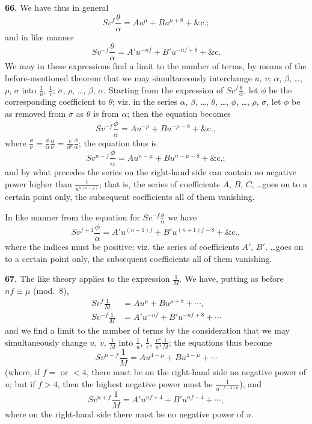 \documentclass[12pt,a4paper]{article}
\begin{document}
\textbf{66.} We have thus in general
\[
Sv^{\!f}\frac{\theta}{\alpha} = Au^{\mu} + Bu^{\mu+8} + \&\text{c.};
\]
and in like manner
\[
Sv^{-\!f}\frac{\theta}{\alpha} = A'u^{-\!nf} + B'u^{-\!nf+8} + \&\text{c.}
\]
We may in these expressions find a limit to the number of terms, by means of the before-mentioned theorem that we may simultaneously interchange $u$, $v$; $\alpha$, $\beta$, \ldots, $\rho$, $\sigma$ into $\frac{1}{u}$, $\frac{1}{v}$; $\sigma$, $\rho$, \ldots, $\beta$, $\alpha$. Starting from the expression of $Sv^{\!f}\frac{\theta}{\alpha}$, let $\phi$ be the corresponding coefficient to $\theta$; viz. in the series $\alpha$, $\beta$, \ldots, $\theta$, \ldots, $\phi$, \ldots, $\rho$, $\sigma$, let $\phi$ be as removed from $\sigma$ as $\theta$ is from $\alpha$; then the equation becomes
\[
Sv^{-\!f}\frac{\phi}{\sigma} = Au^{-\!\mu} + Bu^{-\!\mu-8} + \&\text{c.},
\]
where $\frac{\phi}{\sigma} = \frac{\phi}{\alpha} \frac{\alpha}{\sigma} = \frac{v}{u^n}\frac{\phi}{\alpha}$; the equation thus is
\[
Sv^{\!n-f}\frac{\phi}{\alpha} = Au^{n-\mu} + Bu^{n-\mu-8} + \&\text{c.};
\]
and by what precedes the series on the right-hand side can contain no negative power higher than $\frac{1}{u^{n(n-f)}}$; that is, the series of coefficients $A$, $B$, $C$, \ldots goes on to a certain point only, the subsequent coefficients all of them vanishing.

In like manner from the equation for $Sv^{-\!f}\frac{\theta}{\alpha}$ we have
\[
Sv^{\!f+1}\frac{\phi}{\alpha} = A'u^{(n+1)f} + B'u^{(n+1)f-8} + \&\text{c.},
\]
where the indices must be positive; viz. the series of coefficients $A'$, $B'$, \ldots goes on to a certain point only, the subsequent coefficients all of them vanishing.

\textbf{67.} The like theory applies to the expression $\frac{1}{M}$. We have, putting as before $nf \equiv \mu$ (mod.~8),
\begin{align*}
Sv^{\!f}\frac{1}{M} &= Au^{\mu} + Bu^{\mu+8} + \cdots, \\
Sv^{-\!f}\frac{1}{M} &= A'u^{-\!nf} + B'u^{-\!nf+8} + \cdots
\end{align*}
and we find a limit to the number of terms by the consideration that we may simultaneously change $u$, $v$, $\frac{1}{M}$ into $\frac{1}{u}$, $\frac{1}{v}$, $\frac{v^4}{u^4}\frac{1}{M}$; the equations thus become
\[
Sv^{\!n-f}\frac{1}{M} = Au^{4-\mu} + Bu^{4-\mu} + \cdots
\]
(where, if $f =$ or $< 4$, there must be on the right-hand side no negative power of $u$; but if $f > 4$, then the highest negative power must be $\frac{1}{u^{(f-4)n}}$), and
\[
Sv^{\!n+f}\frac{1}{M} = A'u^{\!nf+4} + B'u^{\!nf-4} + \cdots,
\]
where on the right-hand side there must be no negative power of $u$.
\end{document}
